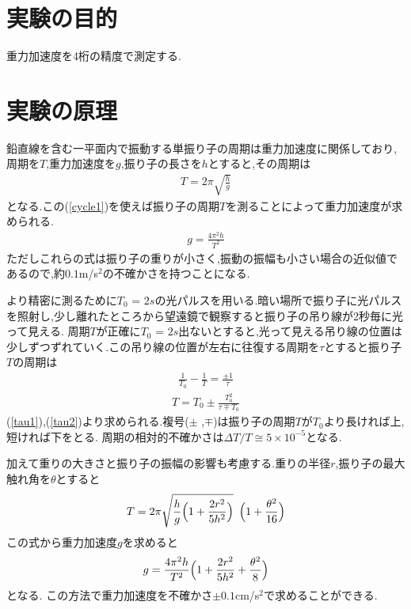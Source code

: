 \documentclass[a4j,10pt]{jarticle}
\begin{document}
  \section{実験の目的}
  重力加速度を4桁の精度で測定する.
  \section{実験の原理}
  鉛直線を含む一平面内で振動する単振り子の周期は重力加速度に関係しており,周期を$T$,重力加速度を$g$,振り子の長さを$h$とすると,その周期は
    \begin{eqnarray}
      \label{cycle1}
      T = 2 \pi\sqrt{\frac{h}{g}}
    \end{eqnarray}
  となる.この(\ref{cycle1})を使えば振り子の周期$T$を測ることによって重力加速度が求められる.
    \begin{eqnarray}
      \label{gravity}
      g = \frac{4 \pi^2 h}{T^2}
    \end{eqnarray}
  ただしこれらの式は振り子の重りが小さく,振動の振幅も小さい場合の近似値であるので,約$0.1$m/s$^2$の不確かさを持つことになる.
  
  より精密に測るために$T_{0}$ = $2s$の光パルスを用いる.暗い場所で振り子に光パルスを照射し,少し離れたところから望遠鏡で観察すると振り子の吊り線が2秒毎に光って見える.
  周期$T$が正確に$T_{0}$ = $2s$出ないとすると,光って見える吊り線の位置は少しずつずれていく.この吊り線の位置が左右に往復する周期を$\tau$とすると振り子$T$の周期は
    \begin{eqnarray}
      \label{tau1}
      \frac{1}{T_{0}}-\frac{1}{T}=\frac{\pm 1}{\tau}
    \end{eqnarray}
    \begin{eqnarray}
      \label{tau2}
        T = T_{0} \pm \frac{T_{0}^2}{\tau \mp T_{0}}
    \end{eqnarray}
  (\ref{tau1}),(\ref{tau2})より求められる.複号($\pm$ ,$ \mp$)は振り子の周期$T$が$T_{0}$より長ければ上,短ければ下をとる.
  周期の相対的不確かさは$\Delta T/T \cong 5\times10^{-5}$となる.
  
  加えて重りの大きさと振り子の振幅の影響も考慮する.重りの半径$r$,振り子の最大触れ角を$\theta$とすると
    \begin{eqnarray}
    \label{cycle2} 
      T = 2\pi \sqrt{\frac{h}{g} \Bigl( 1+\frac{2 r^2}{5 h^2} \Bigl) }  \, \, \,  \Bigl( 1+\frac{\theta^2}{16} \Bigl)
    \end{eqnarray}
  この式から重力加速度$g$を求めると
    \begin{eqnarray}
      \label{gravity2}
      g = \frac{4 \pi^2 h}{T^2} \Bigl(1 + \frac{2r^2}{5h^2} + \frac{\theta^2}{8} \Bigl)
    \end{eqnarray}
  となる.
  この方法で重力加速度を不確かさ$\pm0.1$cm/s$^2$で求めることができる.
\end{document}
